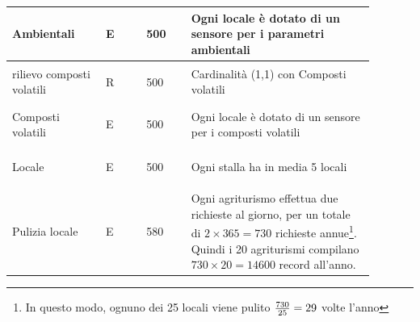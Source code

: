 \documentclass[12pt,a4paper]{article}
\begin{document}
\begin{center}
\begin{longtable}{|p{0.23\linewidth}|p{0.1\linewidth}|p{0.11\linewidth}|p{0.45\linewidth}|}
\hline
Ambientali 				& \begin{center}
\vspace{-25pt}E
\end{center}
					& \begin{center}
					\vspace{-25pt}500\end{center}
					&  Ogni locale è dotato di un sensore per i parametri ambientali \\ 

\hline
rilievo composti volatili 				& \begin{center}
\vspace{-25pt}R
\end{center}
					& \begin{center}
					\vspace{-25pt}500\end{center}
					&  Cardinalità (1,1) con Composti volatili \\ 

\hline
Composti volatili 				& \begin{center}
\vspace{-25pt}E
\end{center}
					& \begin{center}
					\vspace{-25pt}500\end{center}
					&  Ogni locale è dotato di un sensore per i composti volatili \\ 

\hline
Locale 				& \begin{center}
\vspace{-25pt}E
\end{center}
					& \begin{center}
					\vspace{-25pt}500\end{center}
					&  Ogni stalla ha in media 5 locali \\ 

\hline
Pulizia locale 				& \begin{center}
\vspace{-25pt}E
\end{center}
					& \begin{center}
					\vspace{-25pt}580\end{center}
					&  Ogni agriturismo effettua due richieste al giorno, per un totale di $2\times 365=730$ richieste annue\footnote{In questo modo, ognuno dei 25 locali viene pulito ${730\over 25}=29$ volte l'anno}. Quindi i 20 agriturismi compilano $730\times 20=14600$ record all'anno. \\ 


\end{longtable}
\end{center}
\end{document}
